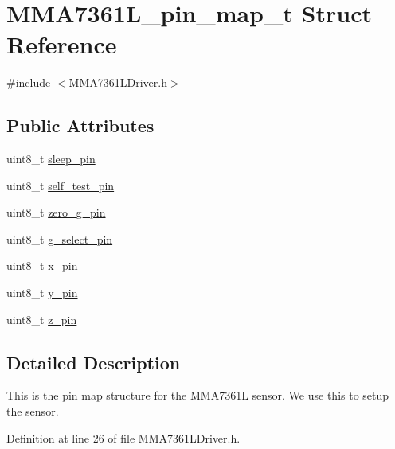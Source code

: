\hypertarget{struct_m_m_a7361_l__pin__map__t}{\section{\-M\-M\-A7361\-L\-\_\-pin\-\_\-map\-\_\-t \-Struct \-Reference}
\label{struct_m_m_a7361_l__pin__map__t}
}


{\ttfamily \#include $<$\-M\-M\-A7361\-L\-Driver.\-h$>$}

\subsection*{\-Public \-Attributes}
\begin{DoxyCompactItemize}
\item 
uint8\-\_\-t \hyperlink{struct_m_m_a7361_l__pin__map__t_a0c98167130063b54ae642ea994e67d87}{sleep\-\_\-pin}
\item 
uint8\-\_\-t \hyperlink{struct_m_m_a7361_l__pin__map__t_a679a9f30750144cb8d4c31027af63c7c}{self\-\_\-test\-\_\-pin}
\item 
uint8\-\_\-t \hyperlink{struct_m_m_a7361_l__pin__map__t_add1b0dcad336c0c422328c6d2fbb4fb5}{zero\-\_\-g\-\_\-pin}
\item 
uint8\-\_\-t \hyperlink{struct_m_m_a7361_l__pin__map__t_a742fe49ea46a18d1ff7d40fabbb3fa2d}{g\-\_\-select\-\_\-pin}
\item 
uint8\-\_\-t \hyperlink{struct_m_m_a7361_l__pin__map__t_a93ff68d61b4910dbfd6787ca60bfa882}{x\-\_\-pin}
\item 
uint8\-\_\-t \hyperlink{struct_m_m_a7361_l__pin__map__t_a9fbc83dd8760370181cb1aec9e2ac764}{y\-\_\-pin}
\item 
uint8\-\_\-t \hyperlink{struct_m_m_a7361_l__pin__map__t_a63f6c5410647242973e4b95f7dfcab9f}{z\-\_\-pin}
\end{DoxyCompactItemize}


\subsection{\-Detailed \-Description}
\-This is the pin map structure for the \-M\-M\-A7361\-L sensor. \-We use this to setup the sensor. 

\-Definition at line 26 of file \-M\-M\-A7361\-L\-Driver.\-h.



